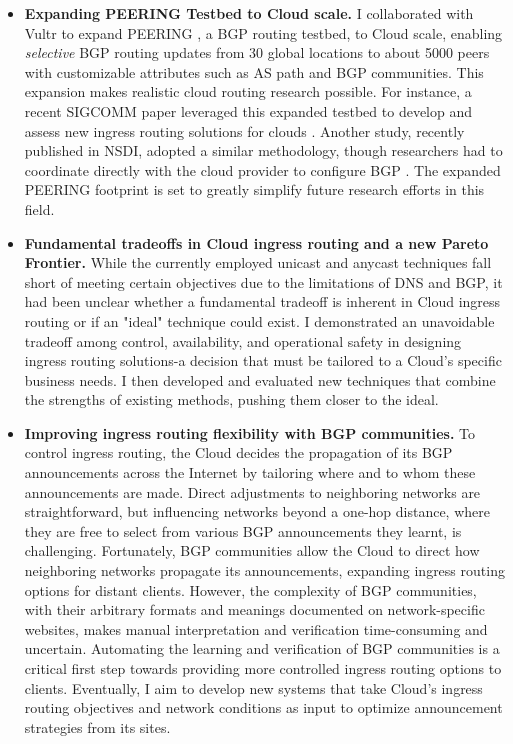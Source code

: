 \documentclass[sigconf,nonacm,screen,letterpaper,10pt]{acmart}
\begin{document}
\begin{itemize}[leftmargin=*]
\item


 \textbf{Expanding PEERING Testbed to Cloud scale.} I collaborated with Vultr to expand PEERING \cite{schlinker19peering}, a BGP routing testbed, to Cloud scale, enabling \textit{selective} BGP routing updates from 30 global locations to about 5000 peers with customizable attributes such as AS path and BGP communities. This expansion makes realistic cloud routing research possible. For instance, a recent SIGCOMM paper leveraged this expanded testbed to develop and assess new ingress routing solutions for clouds \cite{painter}. Another study, recently published in NSDI, adopted a similar methodology, though researchers had to coordinate directly with the cloud provider to configure BGP \cite{tango-nsdi}. The expanded PEERING footprint is set to greatly simplify future research efforts in this field.


\item 
\textbf{Fundamental tradeoffs in Cloud ingress routing and a new Pareto Frontier.} While the currently employed unicast and anycast techniques fall short of meeting certain objectives due to the limitations of DNS and BGP, it had been unclear whether a fundamental tradeoff is inherent in Cloud ingress routing or if an "ideal" technique could exist. I demonstrated an unavoidable tradeoff among control, availability, and operational safety in designing ingress routing solutions-a decision that must be tailored to a Cloud's specific business needs. I then developed and evaluated new techniques that combine the strengths of existing methods, pushing them closer to the ideal.


\item 
\textbf{Improving ingress routing flexibility with BGP communities.} To control ingress routing, the Cloud decides the propagation of its BGP announcements across the Internet by tailoring where and to whom these announcements are made. Direct adjustments to neighboring networks are straightforward, but influencing networks beyond a one-hop distance, where they are free to select from various BGP announcements they learnt, is challenging. Fortunately, BGP communities allow the Cloud to direct how neighboring networks propagate its announcements, expanding ingress routing options for distant clients.  However, the complexity of BGP communities, with their arbitrary formats and meanings documented on network-specific websites, makes manual interpretation and verification time-consuming and uncertain. Automating the learning and verification of BGP communities is a critical first step towards providing more controlled ingress routing options to clients. Eventually, I aim to develop new systems that take Cloud's ingress routing objectives and network conditions as input to optimize announcement strategies from its sites.











\end{itemize}
\end{document}
